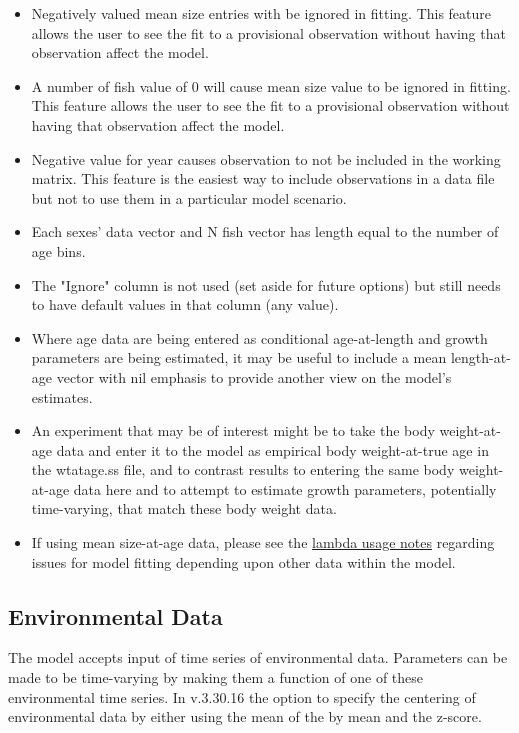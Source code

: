 	\begin{itemize}
		\item Negatively valued mean size entries with be ignored in fitting. This
		feature allows the user to see the fit to a provisional observation without having that
		observation affect the model.
		\item A number of fish value of 0 will cause mean size value to be ignored in fitting. This
		feature allows the user to see the fit to a provisional observation without having that
		observation affect the model.
		\item Negative value for year causes observation to not be included in the working matrix. This feature is the easiest way to include observations in a data file but not to use them in a
		particular model scenario.
		\item Each sexes' data vector and N fish vector has length equal to the number of age bins.
		\item The "Ignore" column is not used (set aside for future options) but still needs to have default values in that column (any value). 
		\item Where age data are being entered as conditional age-at-length and growth parameters are being estimated, it may be useful to include a mean length-at-age vector with nil emphasis to provide another view on the model's estimates.
		\item An experiment that may be of interest might be to take the body weight-at-age data and enter it to the model as empirical body weight-at-true age in the wtatage.ss file, and to contrast results to entering the same body weight-at-age data here and to attempt to estimate growth parameters, potentially time-varying, that match these body weight data.
		\item If using mean size-at-age data, please see the \hyperlink{SaAlambda}{lambda usage notes} regarding issues for model fitting depending upon other data within the model.  		
	\end{itemize}

\hypertarget{env-dat}{}
\subsection{Environmental Data}
The model accepts input of time series of environmental data.  Parameters can be made to be time-varying by making them a function of one of these environmental time series. In v.3.30.16 the option to specify the centering of environmental data by either using the mean of the by mean and the z-score. 

